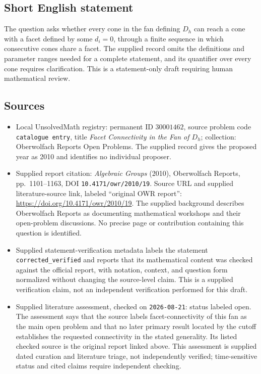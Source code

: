 \documentclass[11pt]{article}
\begin{document}
\subsection{Short English statement}
The question asks whether every cone in the fan defining \(D_h\) can reach a cone with a facet defined by some \(d_i=0\), through a finite sequence in which consecutive cones share a facet. The supplied record omits the definitions and parameter ranges needed for a complete statement, and its quantifier over every cone requires clarification. This is a statement-only draft requiring human mathematical review.
\subsection{Sources}
\begin{itemize}
\item Local UnsolvedMath registry: permanent ID \(30001462\), source problem code \texttt{catalogue entry}, title \emph{Facet Connectivity in the Fan of \(D_h\)}; collection: Oberwolfach Reports Open Problems. The supplied record gives the proposed year as 2010 and identifies no individual proposer.
\item Supplied report citation: \emph{Algebraic Groups} (2010), Oberwolfach Reports, pp.\ 1101--1163, DOI \texttt{10.4171/owr/2010/19}. Source URL and supplied literature-source link, labeled ``original OWR report'': \url{https://doi.org/10.4171/owr/2010/19}. The supplied background describes Oberwolfach Reports as documenting mathematical workshops and their open-problem discussions. No precise page or contribution containing this question is identified.
\item Supplied statement-verification metadata labels the statement \texttt{corrected\_verified} and reports that its mathematical content was checked against the official report, with notation, context, and question form normalized without changing the source-level claim. This is a supplied verification claim, not an independent verification performed for this draft.
\item Supplied literature assessment, checked on \texttt{2026-08-21}: status labeled open. The assessment says that the source labels facet-connectivity of this fan as the main open problem and that no later primary result located by the cutoff establishes the requested connectivity in the stated generality. Its listed checked source is the original report linked above. This assessment is supplied dated curation and literature triage, not independently verified; time-sensitive status and cited claims require independent checking.
\end{itemize}
\end{document}
